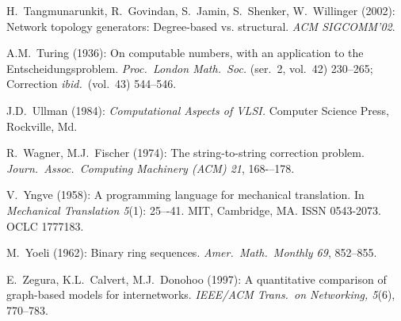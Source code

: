 \begin{thebibliography}{999}

H.~Tangmunarunkit, R.~Govindan, S.~Jamin, S.~Shenker, W.~Willinger (2002):
Network topology generators: Degree-based vs.
structural.  {\it ACM SIGCOMM'02}.

A.M.~Turing (1936): On computable numbers, with an application to the
Entscheidungsproblem.  {\it Proc.~London Math.~Soc.} (ser.~2, vol.~42)
230--265; Correction {\it ibid.}~(vol.~43) 544--546.


J.D.~Ullman (1984):
{\it Computational Aspects of VLSI.}
Computer Science Press, Rockville, Md.



R.~Wagner, M.J.~Fischer (1974):
The string-to-string correction problem.
{\it Journ.~Assoc.~Computing Machinery (ACM) 21}, 168-–178.


V.~Yngve (1958): 
A programming language for mechanical translation.
In {\it Mechanical Translation 5}(1): 25–-41.  MIT, Cambridge, MA.
ISSN 0543-2073. OCLC 1777183.

M.~Yoeli (1962): Binary ring sequences.  {\it Amer.~Math.~Monthly 69},
852--855.


E.~Zegura, K.L.~Calvert, M.J.~Donohoo (1997):
A quantitative comparison of graph-based models for internetworks.
{\it IEEE/ACM Trans.~on Networking, 5}(6), 770--783.
\end{thebibliography}

